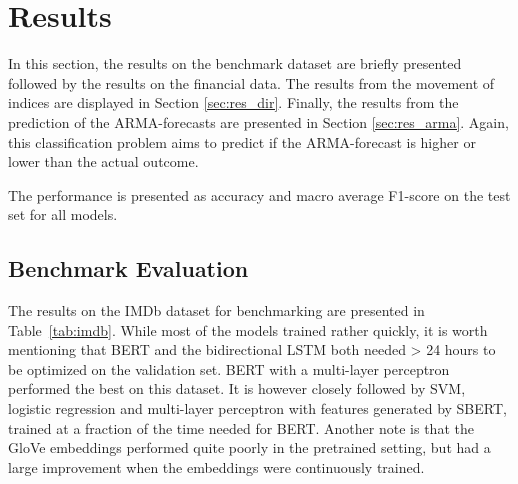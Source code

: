 \chapter{Results}\label{chap:results}

In this section, the results on the benchmark dataset are briefly presented followed by the results on the financial data.
The results from the movement of indices are displayed in Section \ref{sec:res_dir}. Finally, the results from the prediction of the ARMA-forecasts are presented in Section \ref{sec:res_arma}. Again, this classification problem aims to predict if the ARMA-forecast is higher or lower than the actual outcome. 

The performance is presented as accuracy and macro average F1-score on the test set for all models. 

\newpage
\section{Benchmark Evaluation}

The results on the IMDb dataset for benchmarking are presented in Table~\ref{tab:imdb}. While most of the models trained rather quickly, it is worth mentioning that BERT and the bidirectional LSTM both needed > 24 hours to be optimized on the validation set.
BERT with a multi-layer perceptron performed the best on this dataset. It is however closely followed by SVM, logistic regression and multi-layer perceptron with features generated by SBERT, trained at a fraction of the time needed for BERT.
Another note is that the GloVe embeddings performed quite poorly in the pretrained setting, but had a large improvement when the embeddings were continuously trained. 

